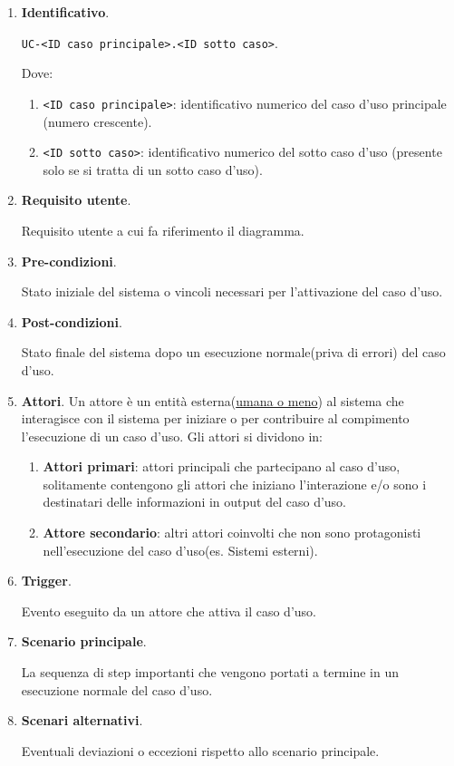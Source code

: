 \begin{enumerate}
    \item \textbf{Identificativo}.
    
    \texttt{UC-<ID caso principale>.<ID sotto caso>}. 
    
    Dove:
    \begin{enumerate}
        \item \texttt{<ID caso principale>}: identificativo numerico del caso d'uso principale (numero crescente).

        \item \texttt{<ID sotto caso>}: identificativo numerico del sotto caso d'uso (presente solo se si tratta di un sotto caso d'uso).
    \end{enumerate}

    \item \textbf{Requisito utente}.
    
    Requisito utente a cui fa riferimento il diagramma.

    \item \textbf{Pre-condizioni}.
    
    Stato iniziale del sistema o vincoli necessari per l'attivazione del caso d'uso.

    \item \textbf{Post-condizioni}.
    
    Stato finale del sistema dopo un esecuzione normale(priva di errori) del caso d'uso.

    \item \textbf{Attori}.
    Un attore è un entità esterna(\underline{umana o meno}) al sistema che interagisce con il sistema per iniziare o per contribuire al compimento l'esecuzione di un caso d'uso.  
    Gli attori si dividono in:
    \begin{enumerate}
        \item  \textbf{Attori primari}: attori principali che partecipano al caso d'uso, solitamente contengono gli attori che iniziano l'interazione e/o sono i destinatari delle informazioni in output del caso d'uso.
        \item \textbf{Attore secondario}: altri attori coinvolti che non sono protagonisti nell'esecuzione del caso d'uso(es. Sistemi esterni).
    \end{enumerate}

    \item \textbf{Trigger}.
    
    Evento eseguito da un attore che attiva il caso d'uso.

    \item \textbf{Scenario principale}.
    
    La sequenza di step importanti che vengono portati a termine in un esecuzione normale del caso d'uso.
    
    \item \textbf{Scenari alternativi}.

    Eventuali deviazioni o eccezioni rispetto allo scenario principale.
\end{enumerate}

